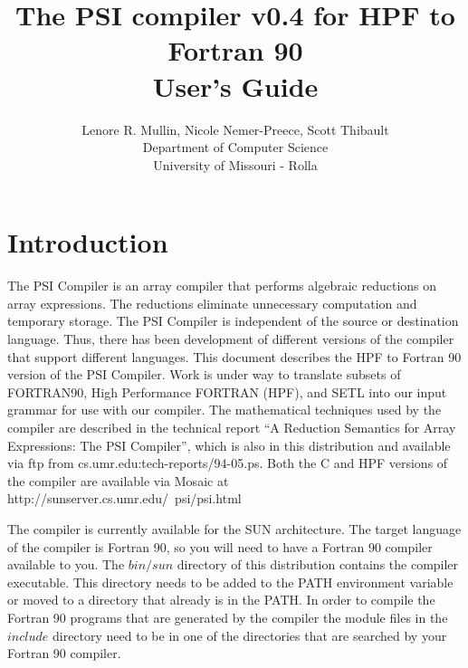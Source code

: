 
\addtolength{\topmargin}{-.75in}
\addtolength{\textwidth}{1.6in}
\setlength{\textheight}{8.75in}
\addtolength{\oddsidemargin}{-0.75in}
\addtolength{\evensidemargin}{-0.75in}
\setlength{\parskip}{.1in}

\title{The PSI compiler v0.4 for HPF to Fortran 90\\User's Guide}
\author{Lenore R. Mullin, Nicole Nemer-Preece,  Scott Thibault \\
Department of Computer Science\\
University of Missouri - Rolla }


\maketitle

\section{Introduction}
The PSI Compiler is an array compiler that performs algebraic reductions on
array expressions.  The reductions eliminate unnecessary computation and 
temporary storage.  The PSI Compiler is independent of the source or 
destination language.  Thus, there has been development of different versions
of the compiler that support different languages.
This document describes the HPF to Fortran 90 version of the PSI Compiler.
Work is under way to translate subsets
of FORTRAN90, High Performance FORTRAN (HPF), and SETL into our input grammar 
for use with our compiler.  The mathematical techniques used by the compiler 
are described in the technical report ``A Reduction Semantics for Array 
Expressions: The PSI Compiler'', which is also in this distribution and
available via ftp from cs.umr.edu:tech-reports/94-05.ps.  Both the
C and HPF versions of the compiler are available via Mosaic at
http://sunserver.cs.umr.edu/~psi/psi.html

The compiler is currently available for the SUN architecture.  The 
target language of the compiler is Fortran 90, so you will need to have a
Fortran 90 compiler available to you.  The $bin/sun$ directory of this 
distribution contains
the compiler executable.  This directory needs to be added to the PATH 
environment variable or moved to a directory that already is in the PATH.  In 
order to compile the Fortran 90
programs that are generated by the compiler the module files in the 
$include$ directory need to be in one of the
directories that are searched by your Fortran 90 compiler.  

